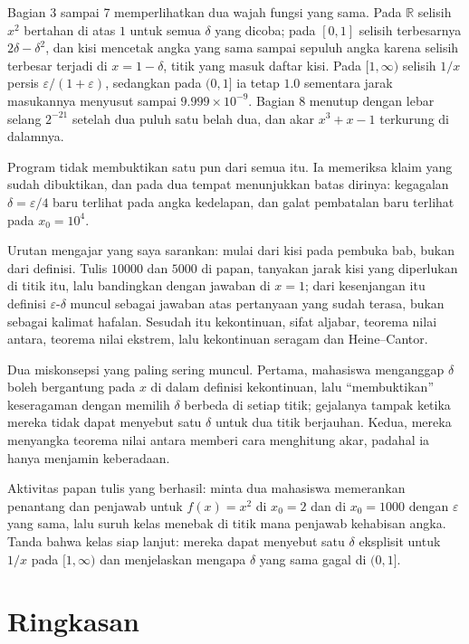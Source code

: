 Bagian 3 sampai 7 memperlihatkan dua wajah fungsi yang sama. Pada $\mathbb{R}$ selisih
$x^{2}$ bertahan di atas $1$ untuk semua $\delta$ yang dicoba; pada $[0,1]$ selisih
terbesarnya $2\delta-\delta^{2}$, dan kisi mencetak angka yang sama sampai sepuluh
angka karena selisih terbesar terjadi di $x=1-\delta$, titik yang masuk daftar kisi.
Pada $[1,\infty)$ selisih $1/x$ persis $\varepsilon/(1+\varepsilon)$, sedangkan pada
$(0,1]$ ia tetap $1.0$ sementara jarak masukannya menyusut sampai
$9.999\times10^{-9}$. Bagian 8 menutup dengan lebar selang $2^{-21}$ setelah dua puluh
satu belah dua, dan akar $x^{3}+x-1$ terkurung di dalamnya.

Program tidak membuktikan satu pun dari semua itu. Ia memeriksa klaim yang sudah
dibuktikan, dan pada dua tempat menunjukkan batas dirinya: kegagalan
$\delta=\varepsilon/4$ baru terlihat pada angka kedelapan, dan galat pembatalan baru
terlihat pada $x_{0}=10^{4}$.

\begin{untukdosen}
Urutan mengajar yang saya sarankan: mulai dari kisi pada pembuka bab, bukan dari
definisi. Tulis $10000$ dan $5000$ di papan, tanyakan jarak kisi yang diperlukan di
titik itu, lalu bandingkan dengan jawaban di $x=1$; dari kesenjangan itu definisi
$\varepsilon$-$\delta$ muncul sebagai jawaban atas pertanyaan yang sudah terasa, bukan
sebagai kalimat hafalan. Sesudah itu kekontinuan, sifat aljabar, teorema nilai antara,
teorema nilai ekstrem, lalu kekontinuan seragam dan Heine--Cantor.

Dua miskonsepsi yang paling sering muncul. Pertama, mahasiswa menganggap $\delta$
boleh bergantung pada $x$ di dalam definisi kekontinuan, lalu ``membuktikan''
keseragaman dengan memilih $\delta$ berbeda di setiap titik; gejalanya tampak ketika
mereka tidak dapat menyebut satu $\delta$ untuk dua titik berjauhan. Kedua, mereka
menyangka teorema nilai antara memberi cara menghitung akar, padahal ia hanya
menjamin keberadaan.

Aktivitas papan tulis yang berhasil: minta dua mahasiswa memerankan penantang dan
penjawab untuk $f(x)=x^{2}$ di $x_{0}=2$ dan di $x_{0}=1000$ dengan $\varepsilon$
yang sama, lalu suruh kelas menebak di titik mana penjawab kehabisan angka. Tanda
bahwa kelas siap lanjut: mereka dapat menyebut satu $\delta$ eksplisit untuk $1/x$
pada $[1,\infty)$ dan menjelaskan mengapa $\delta$ yang sama gagal di $(0,1]$.
\end{untukdosen}

\section{Ringkasan}

